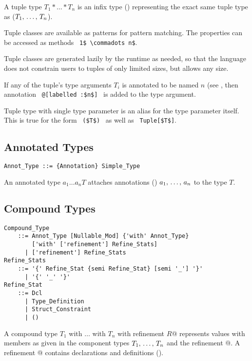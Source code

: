 A tuple type $T_1 * \ldots * T_n$ is an infix type () representing the exact same tuple type as ($T_1 ,\, \ldots ,\, T_n$).

Tuple classes are available as patterns for pattern matching. The properties can be accessed as methods ~\lstinline!1$ \commadots n$!. 

Tuple classes are generated lazily by the runtime as needed, so that the language does not constrain users to tuples of only limited sizes, but allows any size. 

If any of the tuple's type arguments $T_i$ is annotated to be named $n$ (see , then annotation ~\lstinline!@[labelled :$n$]!~ is added to the type argument. 

Tuple type with single type parameter is an alias for the type parameter itself. This is true for the form ~\lstinline!($T$)!~ as well as ~\lstinline!Tuple[$T$]!.






\subsection{Annotated Types}

\grammar\begin{lstlisting}
Annot_Type ::= {Annotation} Simple_Type
\end{lstlisting}

An annotated type $a_1 \ldots a_n T$ attaches annotations () $a_1 ,\, \ldots ,\, a_n$ to the type $T$. 






\subsection{Compound Types}
\label{sec:compound-types}

\grammar\begin{lstlisting}
Compound_Type 
    ::= Annot_Type [Nullable_Mod] {'with' Annot_Type} 
        ['with' ['refinement'] Refine_Stats]
      | ['refinement'] Refine_Stats
Refine_Stats 
    ::= '{' Refine_Stat {semi Refine_Stat} [semi '_'] '}'
      | '{' '_' '}'
Refine_Stat 
    ::= Dcl
      | Type_Definition
      | Struct_Constraint
      | ()
\end{lstlisting}

A compound type \lstinline@$T_1$ with $\ldots$ with $T_n$ with refinement {$R$}@ represents values with members as given in the component types $T_1 ,\, \ldots ,\, T_n$ and the refinement @. A refinement @ contains declarations and definitions (). 

